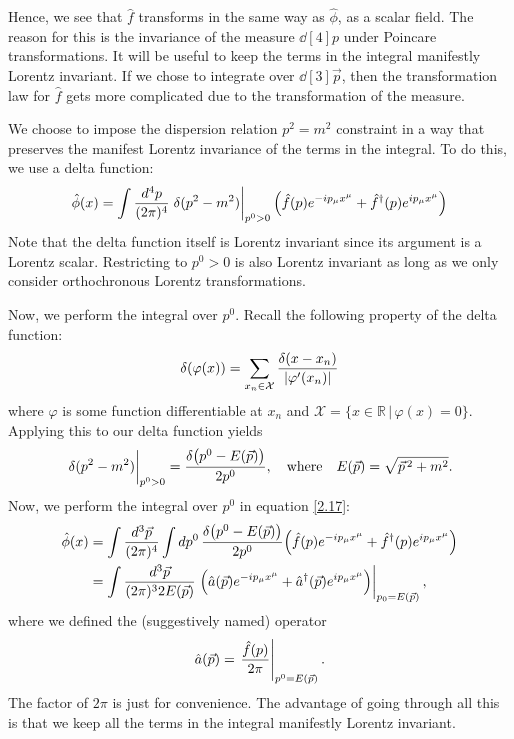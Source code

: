 \documentclass{article}
\begin{document}
Hence, we see that $ \hat{f} $ transforms in the same way as $ \hat{\phi} $, as a scalar field. The reason for this is the invariance of the measure $ \dd[4]p $ under Poincare transformations. It will be useful to keep the terms in the integral manifestly Lorentz invariant. If we chose to integrate over $ \dd[3]{\vec{p}} $, then the transformation law for $ \hat{f} $ gets more complicated due to the transformation of the measure.
\par
We choose to impose the dispersion relation $ p^{2} = m^{2} $ constraint in a way that preserves the manifest Lorentz invariance of the terms in the integral. To do this, we use a delta function:
\begin{equation} \label{2.17}
	\hat{\phi}(x) = \int \frac{\dd[4]{p}}{(2\pi)^{4}} \eval{\delta(p^{2} - m^{2})}_{p^{0} > 0} \qty( \hat{f}(p) e^{-ip_{\mu} x^{\mu}} + \hat{f}^{\dagger}(p) e^{ip_{\mu} x^{\mu}} )
\end{equation}
Note that the delta function itself is Lorentz invariant since its argument is a Lorentz scalar. Restricting to $ p^{0} > 0 $ is also Lorentz invariant as long as we only consider orthochronous Lorentz transformations.
\par
Now, we perform the integral over $ p^{0} $. Recall the following property of the delta function:
\begin{equation}
	\delta(\varphi(x)) = \sum_{x_{n} \in \mathcal{X}} \frac{\delta(x - x_{n})}{\abs{\varphi'(x_{n})}}
\end{equation}
where $ \varphi $ is some function differentiable at $ x_n $ and $ \mathcal{X} = \{ x \in \mathbb{R} \,|\, \varphi(x) = 0 \} $. Applying this to our delta function yields
\begin{equation}
	\eval{\delta(p^{2} - m^{2})}_{p^{0} > 0} = \frac{\delta\qty(p^{0} - E(\vec{p}))}{2p^{0}}, \qq{where} E(\vec{p}) = \sqrt{\vec{p}^{\,2} + m^{2}}.
\end{equation}
Now, we perform the integral over $ p^{0} $ in equation \eqref{2.17}:
\begin{align}
	\begin{split} \label{2.20}
			\hat{\phi}(x) &= \int \frac{\dd[3]{\vec{p}}}{(2\pi)^{4}} \int \dd{p^{0}} \frac{\delta\qty(p^{0} - E(\vec{p}))}{2p^{0}} \qty( \hat{f}(p) e^{-ip_{\mu} x^{\mu}} + \hat{f}^{\dagger}(p) e^{ip_{\mu} x^{\mu}} ) \\
			&= \int \frac{\dd[3]{\vec{p}}}{(2\pi)^{3} 2E(\vec{p})} \eval{\qty(\hat{a}(\vec{p}) e^{-ip_{\mu} x^{\mu}} + \hat{a}^{\dagger} (\vec{p}) e^{ip_{\mu} x^{\mu}})}_{p_{0} = E(\vec{p})},
	\end{split}
\end{align}
where we defined the (suggestively named) operator
\begin{equation}
	\hat{a}(\vec{p}) = \eval{\frac{\hat{f}(p)}{2\pi}}_{p^{0} = E(\vec{p})}.
\end{equation}
The factor of $ 2\pi $ is just for convenience. The advantage of going through all this is that we keep all the terms in the integral manifestly Lorentz invariant. 
\end{document}
